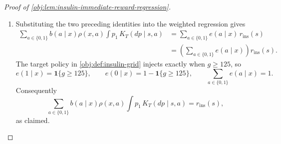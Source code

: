 \documentclass[11pt]{article}
\begin{document}
\begin{proof}[Proof of \cref{obj:lem:insulin-immediate-reward-regression}]
\begin{enumerate}
\item Substituting the two preceding identities into the weighted regression gives
\[
\begin{aligned}
\sum_{a\in\{0,1\}}b(a\mid x)\rho(x,a)
   \int p_1\,K_T(dp\mid s,a)
&=
\sum_{a\in\{0,1\}}e(a\mid x)\,r_{\mathrm{ins}}(s)\\
&=
\left(\sum_{a\in\{0,1\}}e(a\mid x)\right)r_{\mathrm{ins}}(s).
\end{aligned}
\]
The target policy in \cref{obj:def:insulin-grid} injects exactly when \(g\ge125\), so
\[
e(1\mid x)=\mathbf 1\{g\ge125\},
\qquad
e(0\mid x)=1-\mathbf 1\{g\ge125\},
\qquad
\sum_{a\in\{0,1\}}e(a\mid x)=1 .
\]
Consequently
\[
\sum_{a\in\{0,1\}}b(a\mid x)\rho(x,a)
   \int p_1\,K_T(dp\mid s,a)
=
r_{\mathrm{ins}}(s),
\]
as claimed. %
\end{enumerate}
\end{proof}
\end{document}
